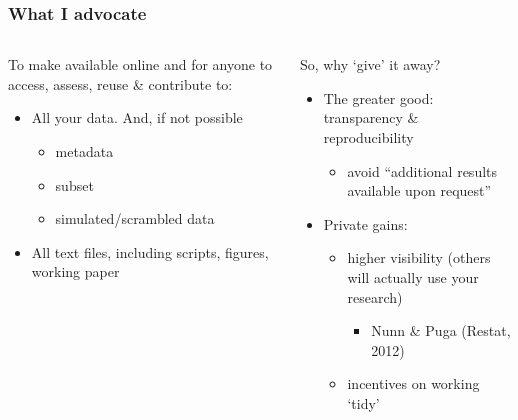 \documentclass[ignorenonframetext]{beamer}
\begin{document}
\begin{frame}
  \frametitle{What I advocate}
  \begin{columns}
    \begin{column}{.5\textwidth}
      To make available online and for anyone to \alert{access}, \alert{assess}, \alert{reuse} \& \alert{contribute} to:
      \begin{itemize}
        \item All your \alert{data}. And, if not possible
          \begin{itemize}
            \item metadata
            \item subset
            \item simulated/scrambled data
          \end{itemize}
        \item All \alert{text} files, including scripts, figures, working paper\pause
        \end{itemize}
    \end{column}

    \begin{column}{.5\textwidth}
      So, why `give' it away?
      \begin{itemize}
        \item The greater good: \alert{transparency} \& \alert{reproducibility}
          \begin{itemize}
            \item avoid ``additional results available upon request''
          \end{itemize}
        \item \alert{Private} gains:
          \begin{itemize}
            \item higher visibility (others will actually use your research)
              \begin{itemize}
\item Nunn \& Puga (Restat, 2012)
              \end{itemize}
              \item incentives on working `tidy'
          \end{itemize}
      \end{itemize}
    \end{column}
  \end{columns}
\end{frame}
\end{document}
